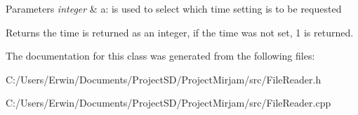 \begin{DoxyParams}{Parameters}
{\em integer} & a\+: is used to select which time setting is to be requested \\
\hline
\end{DoxyParams}
\begin{DoxyReturn}{Returns}
the time is returned as an integer, if the time was not set, 1 is returned. 
\end{DoxyReturn}


The documentation for this class was generated from the following files\+:\begin{DoxyCompactItemize}
\item 
C\+:/\+Users/\+Erwin/\+Documents/\+Project\+S\+D/\+Project\+Mirjam/src/File\+Reader.\+h\item 
C\+:/\+Users/\+Erwin/\+Documents/\+Project\+S\+D/\+Project\+Mirjam/src/File\+Reader.\+cpp\end{DoxyCompactItemize}

